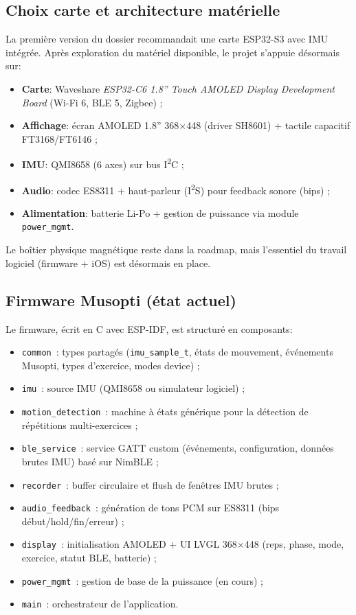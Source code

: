 \documentclass[a4paper,11pt]{article}
\begin{document}
\subsection{Choix carte et architecture matérielle}

La première version du dossier recommandait une carte ESP32-S3 avec IMU intégrée. Après exploration du matériel disponible, le projet s'appuie désormais sur:
\begin{itemize}
  \item \textbf{Carte}: Waveshare \emph{ESP32-C6 1.8'' Touch AMOLED Display Development Board} (Wi-Fi 6, BLE 5, Zigbee) ;
  \item \textbf{Affichage}: écran AMOLED 1.8'' 368$\times$448 (driver SH8601) + tactile capacitif FT3168/FT6146 ;
  \item \textbf{IMU}: QMI8658 (6 axes) sur bus I\textsuperscript{2}C ;
  \item \textbf{Audio}: codec ES8311 + haut-parleur (I\textsuperscript{2}S) pour feedback sonore (bips) ;
  \item \textbf{Alimentation}: batterie Li-Po + gestion de puissance via module \texttt{power\_mgmt}.
\end{itemize}

Le boîtier physique magnétique reste dans la roadmap, mais l'essentiel du travail logiciel (firmware + iOS) est désormais en place.

\subsection{Firmware Musopti (état actuel)}

Le firmware, écrit en C avec ESP-IDF, est structuré en composants:
\begin{itemize}
  \item \texttt{common}~: types partagés (\texttt{imu\_sample\_t}, états de mouvement, événements Musopti, types d'exercice, modes device) ;
  \item \texttt{imu}~: source IMU (QMI8658 ou simulateur logiciel) ;
  \item \texttt{motion\_detection}~: machine à états générique pour la détection de répétitions multi-exercices ;
  \item \texttt{ble\_service}~: service GATT custom (événements, configuration, données brutes IMU) basé sur NimBLE ;
  \item \texttt{recorder}~: buffer circulaire et flush de fenêtres IMU brutes ;
  \item \texttt{audio\_feedback}~: génération de tons PCM sur ES8311 (bips début/hold/fin/erreur) ;
  \item \texttt{display}~: initialisation AMOLED + UI LVGL 368$\times$448 (reps, phase, mode, exercice, statut BLE, batterie) ;
  \item \texttt{power\_mgmt}~: gestion de base de la puissance (en cours) ;
  \item \texttt{main}~: orchestrateur de l'application.
\end{itemize}
\end{document}
